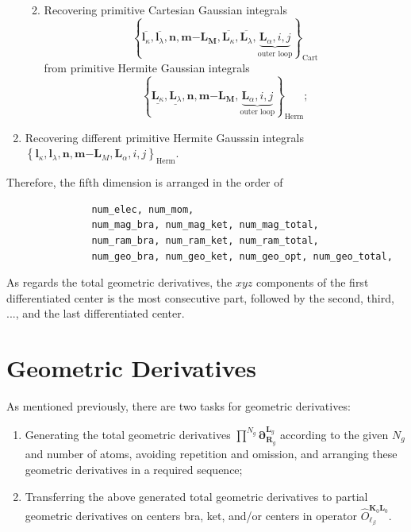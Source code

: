 \documentclass[a4paper,11pt,twoside,openright]{book}
\begin{document}
\begin{enumerate}
\begin{enumerate}
\begin{align}
        \end{align}
      \item Recovering primitive Cartesian Gaussian integrals
        \[
          \left\{\overline{\boldsymbol{l}_{\kappa}},\overline{\boldsymbol{l}_{\lambda}},%
          \boldsymbol{n},\boldsymbol{m}\mathrm{-}\boldsymbol{L}_{\boldsymbol{M}},
          \overline{\boldsymbol{L}_{\kappa}},\overline{\boldsymbol{L}_{\lambda}},%
          \underbrace{\boldsymbol{L}_{\alpha},i,j}_{\text{outer loop}}\right\}_{\text{Cart}}
        \]
        from primitive Hermite Gaussian integrals
        \[
          \left\{\underline{\boldsymbol{L}_{\kappa}},\underline{\boldsymbol{L}_{\lambda}},%
          \boldsymbol{n},\boldsymbol{m}\mathrm{-}\boldsymbol{L}_{\boldsymbol{M}},%
          \underbrace{\boldsymbol{L}_{\alpha},i,j}_{\text{outer loop}}\right\}_{\text{Herm}};
        \]
    \end{enumerate}
%
  \item Recovering different primitive Hermite Gausssin integrals %
    $\left\{\boldsymbol{l}_{\kappa},\boldsymbol{l}_{\lambda},\boldsymbol{n},%
      \boldsymbol{m}\mathrm{-}\boldsymbol{L}_{M},%
      \boldsymbol{L}_{\alpha},i,j\right\}_{\text{Herm}}$.
\end{enumerate}

Therefore, the fifth dimension is arranged in the order of
\begin{verbatim}
               num_elec, num_mom,
               num_mag_bra, num_mag_ket, num_mag_total,
               num_ram_bra, num_ram_ket, num_ram_total,
               num_geo_bra, num_geo_ket, num_geo_opt, num_geo_total,
\end{verbatim}
As regards the total geometric derivatives, the $xyz$ components of the first differentiated center
is the most consecutive part, followed by the second, third, ..., and the last differentiated center.

\section{Geometric Derivatives}
\label{sect:geometric}

As mentioned previously, there are two tasks for geometric derivatives:
\begin{enumerate}
  \item Generating the total geometric derivatives
    $\prod^{N_{g}}\boldsymbol{\partial}_{\boldsymbol{R}_{g}}^{\boldsymbol{L}_{g}}$
    according to the given $N_{g}$ and number of atoms, avoiding
    repetition and omission, and arranging these geometric derivatives in a required sequence;
  \item Transferring the above generated total geometric derivatives to partial geometric derivatives
    on centers bra, ket, and/or centers in operator $\hat{O}_{\ell_{\beta}}^{\boldsymbol{K}_{0}\boldsymbol{L}_{0}}$.
\end{enumerate}
\end{document}

